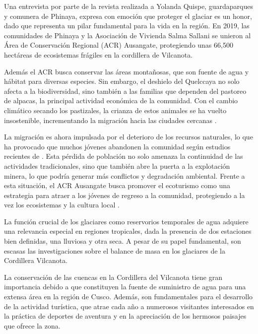 Una entrevista por parte de la revista realizada a Yolanda Quispe, guardaparques y comunera de Phinaya, expresa con emoción que proteger el glaciar es un honor, dado que representa un pilar fundamental para la vida en la región. En 2019, las comunidades de Phinaya y la Asociación de Vivienda Salma Sallani se unieron al Área de Conservación Regional (ACR) Ausangate, protegiendo unas 66,500 hectáreas de ecosistemas frágiles en la cordillera de Vilcanota.

Además el ACR busca conservar las áreas montañosas, que son fuente de agua y hábitat para diversas especies. Sin embargo, el deshielo del Quelccaya no solo afecta a la biodiversidad, sino también a las familias que dependen del pastoreo de alpacas, la principal actividad económica de la comunidad. Con el cambio climático secando los pastizales, la crianza de estos animales se ha vuelto insostenible, incrementando la migración hacia las ciudades cercanas \parencite{ojopublico2024}.

La migración es ahora impulsada por el deterioro de los recursos naturales, lo que ha provocado que muchos jóvenes abandonen la comunidad según estudios recientes de \parencite{costa2022migraccoes}. Esta pérdida de población no solo amenaza la continuidad de las actividades tradicionales, sino que también abre la puerta a la explotación minera, lo que podría generar más conflictos y degradación ambiental. Frente a esta situación, el ACR Ausangate busca promover el ecoturismo como una estrategia para atraer a los jóvenes de regreso a la comunidad, protegiendo a la vez los ecosistemas y la cultura local \parencite{ojopublico2024}.


La función crucial de los glaciares como reservorios temporales de agua adquiere una relevancia especial en regiones tropicales, dada la presencia de dos estaciones bien definidas, una lluviosa y otra seca. A pesar de su papel fundamental, son escasas las investigaciones sobre el balance de masa en los glaciares de la Cordillera Vilcanota. \parencite{porcel2015iniciacion}

La conservación de las cuencas en la Cordillera del Vilcanota tiene gran importancia debido a que constituyen la fuente de suministro de agua para una extensa área en la región de Cusco. Además, son fundamentales para el desarrollo de la actividad turística, que atrae cada año a numerosos visitantes interesados en la práctica de deportes de aventura y en la apreciación de los hermosos paisajes que ofrece la zona.

